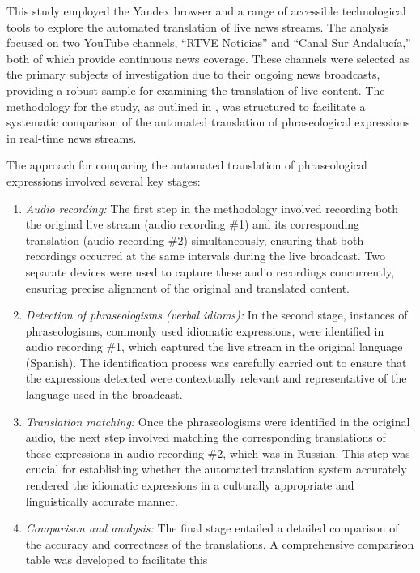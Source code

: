 This study employed the Yandex browser and a range of accessible
technological tools to explore the automated translation of live news
streams. The analysis focused on two YouTube channels, ``RTVE Noticias''
and ``Canal Sur Andalucía,'' both of which provide continuous news
coverage. These channels were selected as the primary subjects of
investigation due to their ongoing news broadcasts, providing a robust
sample for examining the translation of live content. The methodology
for the study, as outlined in , was structured to facilitate a
systematic comparison of the automated translation of phraseological
expressions in real-time news streams.

The approach for comparing the automated translation of phraseological
expressions involved several key stages:

\begin{enumerate}
\def\labelenumi{\arabic{enumi}.}
\item
  \emph{Audio recording:} The first step in the methodology involved
  recording both the original live stream (audio recording \#1) and its
  corresponding translation (audio recording \#2) simultaneously,
  ensuring that both recordings occurred at the same intervals during
  the live broadcast. Two separate devices were used to capture these
  audio recordings concurrently, ensuring precise alignment of the
  original and translated content.
\item
  \emph{Detection of phraseologisms (verbal idioms):} In the second
  stage, instances of phraseologisms, commonly used idiomatic
  expressions, were identified in audio recording \#1, which captured
  the live stream in the original language (Spanish). The identification
  process was carefully carried out to ensure that the expressions
  detected were contextually relevant and representative of the language
  used in the broadcast.
\item
  \emph{Translation matching:} Once the phraseologisms were identified
  in the original audio, the next step involved matching the
  corresponding translations of these expressions in audio recording
  \#2, which was in Russian. This step was crucial for establishing
  whether the automated translation system accurately rendered the
  idiomatic expressions in a culturally appropriate and linguistically
  accurate manner.
\item
  \emph{Comparison and analysis:} The final stage entailed a detailed
  comparison of the accuracy and correctness of the translations. A
  comprehensive comparison table was developed to facilitate this

\end{enumerate}
